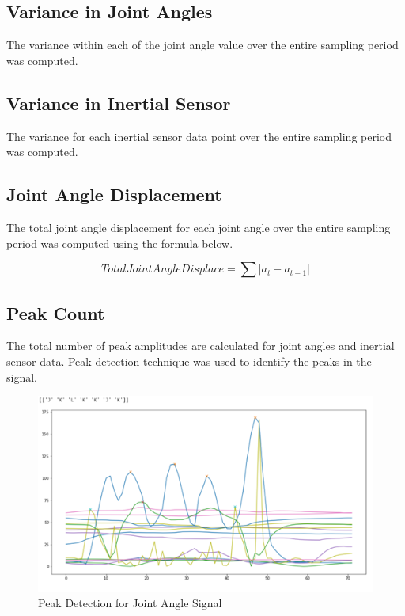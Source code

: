 \documentclass[conference]{IEEEtran}
\begin{document}
\subsection{Variance in Joint Angles}

The variance within each of the joint angle value over the
entire sampling period was computed. 

\subsection{Variance in Inertial Sensor}

The variance for each inertial sensor data point over the entire
sampling period was computed. 

\subsection{Joint Angle Displacement}

The total joint angle displacement for each joint angle
over the entire sampling period was computed using the
formula below.

\begin{equation}
Total Joint Angle Displace = \sum |a_t - a_{t-1}|
\end{equation}


\subsection{Peak Count}

The total number of peak amplitudes are calculated for
joint angles and inertial sensor data. Peak detection
technique was used to identify the peaks in the signal. 

\begin{figure}[H]
\begin{center}
\includegraphics[scale=1]{Image/Peak_Detection.png}
\caption{\label{fig:Peak_Detection} Peak Detection for
Joint Angle Signal}
\end{center}
\end{figure}
\end{document}
